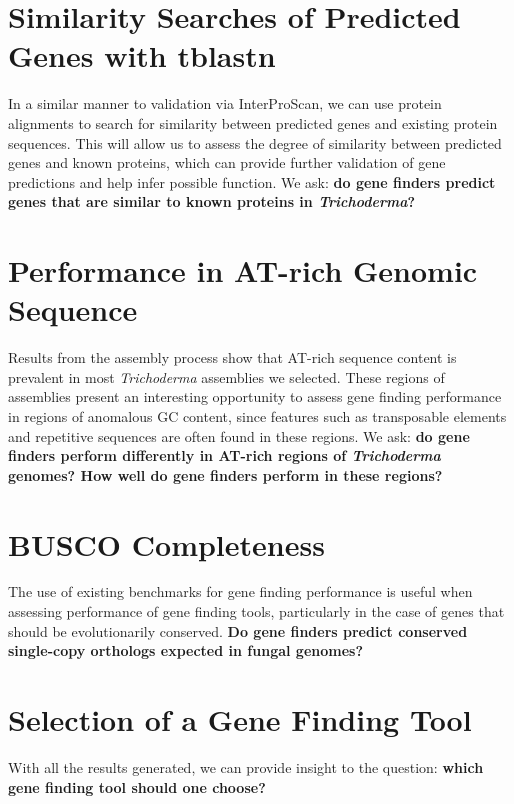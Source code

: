 \section{Similarity Searches of Predicted Genes with tblastn}
\label{rq:tblastn}
In a similar manner to validation via InterProScan, we can use protein alignments to search for similarity between predicted genes and existing protein sequences. This will allow us to assess the degree of similarity between predicted genes and known proteins, which can provide further validation of gene predictions and help infer possible function. We ask: \textbf{do gene finders predict genes that are similar to known proteins in \textit{Trichoderma}?}


\section{Performance in AT-rich Genomic Sequence}
\label{rq:anomalous-sequence-content}
Results from the assembly process show that AT-rich sequence content is prevalent in most \textit{Trichoderma} assemblies we selected. These regions of assemblies present an interesting opportunity to assess gene finding performance
in regions of anomalous GC content, since features such as transposable elements and repetitive sequences are often found in these regions. We ask: \textbf{do gene finders perform differently in AT-rich regions of \textit{Trichoderma} genomes? How well do gene finders perform in these regions?}   

\section{BUSCO Completeness}
\label{rq:busco-completeness}
The use of existing benchmarks for gene finding performance is useful
when assessing performance of gene finding tools, particularly in the
case of genes that should be evolutionarily conserved. \textbf{Do gene
  finders predict conserved single-copy orthologs expected in fungal
  genomes?}

\section{Selection of a Gene Finding Tool}

With all the results generated, we can provide insight to the
question: \textbf{which gene finding tool should one choose?}
